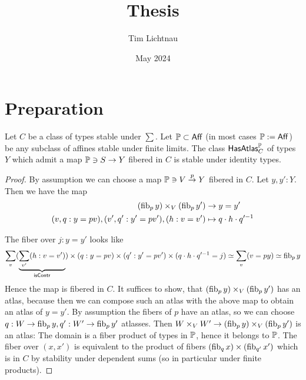 \documentclass{article}
\title{Thesis}
\author{Tim Lichtnau }
\date{May 2024}
\newcommand{\Aff}{\mathsf{Aff}}
\begin{document}
\newtheorem*{warning}{Warning}
\newtheorem*{why}{Why I did it this way}
\newtheorem*{think}{Think about}
\maketitle
\tableofcontents


\section{Preparation}


\begin{lemma}{\label{lemma:havingAbstractAtlasClosedUnderId}}
	Let $C$ be a class of types stable under $\sum$. Let $\bP \subset \Aff$ (in most cases $\bP := \Aff$) be any subclass of affines stable under finite limits.  %
	The class $\mathsf{HasAtlas}_C^{\mathbb{P}}$ of types $Y$ which admit a map $\mathbb{P} \ni S \to Y$ fibered in $C$ is stable under identity types. \\
	
\end{lemma}
\begin{proof}
	
	By assumption we can choose a map $\mathbb{P} \ni V \overset{p}{\to} Y$ fibered in $C$. Let $y,y' : Y$.  Then we have the map
	\begin{align*}
		(\operatorname{fib}_p y) \times_V (\operatorname{fib}_p y') &\to y = y' \\
		(v , q : y = p v) , (v', q' : y' = p v') , (h : v = v') &\mapsto q \cdot h \cdot q'^{-1}
	\end{align*}
	
	The fiber over $j : y = y'$ looks like  %
	\[
	\sum_{v}  ( \underbrace{\sum_{v'} (h : v = v')}_{\mathsf{isContr}}) \times (q : y = p v) \times (q'  : y' = p v') \times (q \cdot h \cdot q'^{-1} = j) \simeq \sum_v (v = py) \simeq \operatorname{fib}_p y
	\]
	Hence the map is fibered in $C$. It suffices to show, that	$(\operatorname{fib}_p y) \times_V (\operatorname{fib}_p y')$ has an atlas, because then we can compose such an atlas with the above map to obtain an atlas of $y = y'$.
	By assumption the fibers of $p$ have an atlas, so we can choose $q : W \to \operatorname{fib}_p y, q' : W' \to \operatorname{fib}_p y'$ atlasses. Then $W \times_V W' \to (\operatorname{fib}_p y) \times_V (\operatorname{fib}_p y')$ is an atlas: The domain is a fiber product of types in $\mathbb{P}$, hence it belongs to $\mathbb{P}$. The fiber over $(x,x')$ is equivalent to the product of fibers $(\operatorname{fib}_q x) \times (\operatorname{fib}_{q'} x')$ which is in $C$ by stability under dependent sums (so in particular under finite products).
	
\end{proof}
\end{document}
